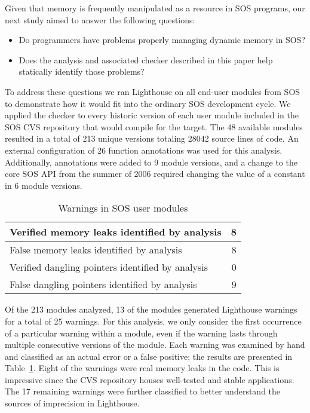 Given that memory is frequently manipulated as a resource in SOS
programs, our next study aimed to answer the following questions:
%
\begin{itemize}
%
\item Do programmers have problems properly managing dynamic memory in
SOS?
%
\item Does the analysis and associated checker described in this paper
help statically identify those problems?
%
\end{itemize}



To address these questions we ran Lighthouse on all end-user modules
from SOS to demonstrate how it would fit into the ordinary SOS
development cycle.  
%
We applied the checker to every historic version of each user module
included in the SOS CVS repository that would compile for the
 target.  
%
The 48 available modules resulted in a total of 213 unique versions
totaling 28042 source lines of code.
%
An external configuration of 26 function annotations was used for this
analysis.
%
Additionally,  annotations were added to 9 module
versions, and a change to the core SOS API from the summer of 2006
required changing the value of a constant in 6 module versions.



\begin{table}
\caption{Warnings in SOS user modules}
%
\label{tab:module}
\centering 
\begin{tabular}{| l | r |}
    \hline 
    Verified memory leaks identified by analysis & 8 \\
    \hline
    False memory leaks identified by analysis & 8 \\
    \hline 
    Verified dangling pointers identified by analysis & 0 \\
    \hline 
    False dangling pointers identified by analysis & 9 \\
    \hline 
\end{tabular} 
%
\end{table}



Of the 213 modules analyzed, 13 of the modules generated Lighthouse
warnings for a total of 25 warnings.
%
For this analysis, we only consider the first occurrence of a particular
warning within a module, even if the warning lasts through multiple
consecutive versions of the module.  
%
Each warning was examined by hand and classified as an actual error or a
false positive; the results are presented in Table~\ref{tab:module}.  
%
Eight of the warnings were real memory leaks in the code.  This is
impressive since the CVS repository houses well-tested and stable
applications.
%
The 17 remaining warnings were further classified to better understand
the sources of imprecision in Lighthouse.  



